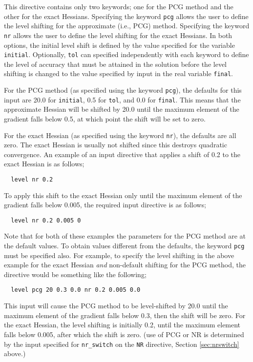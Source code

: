 This directive contains only two keywords; one for the PCG method and
the other for the exact Hessians.  Specifying the keyword \verb+pcg+
allows the user to define the level shifting for the approximate
(i.e., PCG) method.  Specifying the keyword \verb+nr+ allows the user
to define the level shifting for the exact Hessians.  In both options,
the initial level shift is defined by the value specified for the
variable \verb+initial+.  Optionally, \verb+tol+ can specified
independently with each keyword to define the level of accuracy that
must be attained in the solution before the level shifting is changed
to the value specified by input in the real variable \verb+final+.

For the PCG method (as specified using the keyword \verb+pcg+), the
defaults for this input are 20.0 for \verb+initial+, 0.5 for
\verb+tol+, and 0.0 for \verb+final+.  This means that the
approximate Hessian will be shifted by 20.0 until the maximum element
of the gradient falls below 0.5, at which point the shift will be set
to zero.

For the exact Hessian (as specified using the keyword \verb+nr+), the
defaults are all zero.  The exact Hessian is usually not shifted since
this destroys quadratic convergence.  An example of an input directive
that applies a shift of 0.2 to the exact Hessian is as follows;

\begin{verbatim}
  level nr 0.2
\end{verbatim}

To apply this shift to the exact Hessian only until the maximum
element of the gradient falls below 0.005, the required input
directive is as follows;

\begin{verbatim}
  level nr 0.2 0.005 0
\end{verbatim}

Note that for both of these examples the parameters for the PCG method
are at the default values.  To obtain values different from the
defaults, the keyword \verb+pcg+ must be specified also.  For example,
to specify the level shifting in the above example for the exact
Hessian {\em and} non-default shifting for the PCG method, the
directive would be something like the following;

\begin{verbatim}
  level pcg 20 0.3 0.0 nr 0.2 0.005 0.0
\end{verbatim}

This input will cause the PCG method to be level-shifted by 20.0 until
the maximum element of the gradient falls below 0.3, then the shift
will be zero.  For the exact Hessian, the level shifting is initially
0.2, until the maximum element falls below 0.005, after which the
shift is zero.  (use of PCG or NR is determined by the input specified
for \verb+nr_switch+ on the \verb+NR+ directive, Section
\ref{sec:nrswitch} above.)

